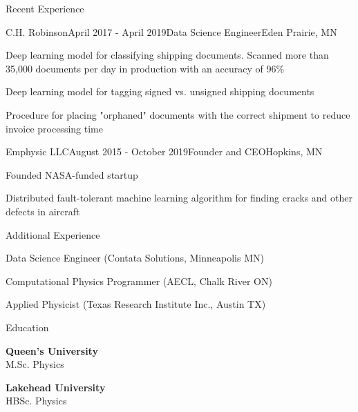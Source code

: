 \documentclass[
	11pt, %
]{resume} %
\begin{document}
\begin{rSection}{Recent Experience}
	\begin{rSubsection}{C.H. Robinson}{April 2017 - April 2019}{Data Science Engineer}{Eden Prairie, MN}
		\item Deep learning model for classifying shipping documents. Scanned more than 35,000 documents per day in production with an accuracy of 96\%
		\item Deep learning model for tagging signed vs. unsigned shipping documents
		\item Procedure for placing "orphaned" documents with the correct shipment to reduce invoice processing time
	\end{rSubsection}
	
	\begin{rSubsection}{Emphysic LLC}{August 2015 - October 2019}{Founder and CEO}{Hopkins, MN}
		\item Founded NASA-funded startup
		\item Distributed fault-tolerant machine learning algorithm for finding cracks and other defects in aircraft
	\end{rSubsection}
	
	\begin{rSubsection}{Additional Experience}{}{}{}
		\item Data Science Engineer (Contata Solutions, Minneapolis MN)
		\item Computational Physics Programmer (AECL, Chalk River ON)
		\item Applied Physicist (Texas Research Institute Inc., Austin TX)
	\end{rSubsection}

\end{rSection}

\pagebreak

\begin{rSection}{Education}
	
	\textbf{Queen's University} \hfill \\ 
	M.Sc. Physics
	
	\textbf{Lakehead University} \hfill \\ 
	HBSc. Physics
\end{rSection}
\end{document}
